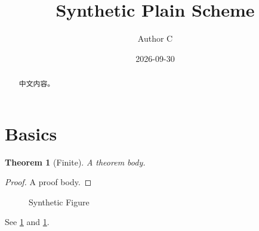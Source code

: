\documentclass[fontset=fandol,scheme=plain]{ctexart}
\title{Synthetic Plain Scheme}
\author{Author C}
\date{2026-09-30}
\newtheorem{theorem}{Theorem}[section]
\begin{document}
\maketitle
\begin{abstract}中文内容。\end{abstract}
\tableofcontents
\section{Basics}\label{sec:intro}
\begin{theorem}[Finite]\label{thm:one}
A theorem body.
\end{theorem}
\begin{proof}A proof body.\end{proof}
\begin{figure}\centering\caption{Synthetic Figure}\label{fig:one}\end{figure}
See \ref{thm:one} and \ref{fig:one}.
\end{document}

